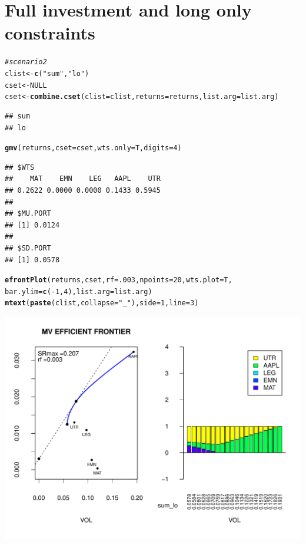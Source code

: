 \documentclass{uwstat518}\usepackage[]{graphicx}\usepackage[]{color}
\makeatletter
\def\maxwidth{ %
  \ifdim\Gin@nat@width>\linewidth
    \linewidth
  \else
    \Gin@nat@width
  \fi
}
\newcommand{\hlstr}[1]{\textcolor[rgb]{0.192,0.494,0.8}{#1}}%
\newcommand{\hlcom}[1]{\textcolor[rgb]{0.678,0.584,0.686}{\textit{#1}}}%
\newcommand{\hlkwd}[1]{\textcolor[rgb]{0.737,0.353,0.396}{\textbf{#1}}}%
\newenvironment{kframe}{%
 \def\at@end@of@kframe{}%
 \ifinner\ifhmode%
  \def\at@end@of@kframe{\end{minipage}}%
  \begin{minipage}{\columnwidth}%
 \fi\fi%
 \def\FrameCommand##1{\hskip\@totalleftmargin \hskip-\fboxsep
 \colorbox{shadecolor}{##1}\hskip-\fboxsep
     \hskip-\linewidth \hskip-\@totalleftmargin \hskip\columnwidth}%
 \MakeFramed {\advance\hsize-\width
   \@totalleftmargin\z@ \linewidth\hsize
   \@setminipage}}%
 {\par\unskip\endMakeFramed%
 \at@end@of@kframe}
\newenvironment{knitrout}{}{} %
\makeatother
\begin{document}
\section{Full investment and long only constraints}
\begin{knitrout}
\color{fgcolor}\begin{kframe}
\begin{alltt}
\hlcom{# scenario 2}
clist <- \hlkwd{c}(\hlstr{"sum"},\hlstr{"lo"})
cset <- NULL
cset <-\hlkwd{combine.cset}(clist=clist,returns=returns,list.arg=list.arg)
\end{alltt}
\begin{verbatim}
## sum 
## lo
\end{verbatim}
\begin{alltt}
\hlkwd{gmv}(returns, cset=cset, wts.only=T,digits=4)
\end{alltt}
\begin{verbatim}
## $WTS
##    MAT    EMN    LEG   AAPL    UTR 
## 0.2622 0.0000 0.0000 0.1433 0.5945 
## 
## $MU.PORT
## [1] 0.0124
## 
## $SD.PORT
## [1] 0.0578
\end{verbatim}
\begin{alltt}
\hlkwd{efrontPlot}(returns, cset, rf = .003, npoints = 20,wts.plot = T,
		bar.ylim = \hlkwd{c}(-1,4),list.arg=list.arg)
\hlkwd{mtext}(\hlkwd{paste}(clist,collapse=\hlstr{"_"}),side=1,line=3)	
\end{alltt}
\end{kframe}
\includegraphics[width=\maxwidth]{figure/unnamed-chunk-5} 

\end{knitrout}
\end{document}
